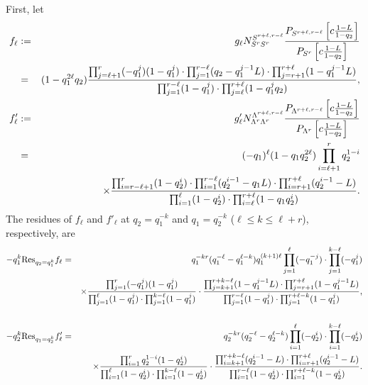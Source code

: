\documentclass[hyper,letterpaper]{JHEP3}
\begin{document}
First, let
\begin{eqnarray}
f_\ell
&:=&
g_{\ell}
N_{S^rS^r}^{S^{r+\ell,r-\ell}}
\frac{
P_{S^{r+\ell,r-\ell}}\left[ c\frac{1-L}{1-q_2} \right]
}{
P_{S^r}\left[ c\frac{1-L}{1-q_2} \right]
}
\nonumber \\
&=&
( 1-q_1^{2\ell}q_2 )
\frac{
\prod_{j=\ell+1}^{r}(-q_1^{j})( 1-q_1^{j} )
\cdot
\prod_{j=1}^{r-\ell} ( q_2-q_1^{j-1}L )
\cdot
\prod_{j=r+1}^{r+\ell} ( 1-q_1^{j-1}L )
}{
\prod_{j=1}^{r-\ell}( 1-q_1^{j} )
\cdot
\prod_{j=\ell}^{r+\ell} ( 1-q_1^{j}q_2 )
}
,
\\
f'_\ell
&:=&
g'_{\ell}
N_{\Lambda^r\Lambda^r}^{\Lambda^{r+\ell,r-\ell}}
\frac{
P_{\Lambda^{r+\ell,r-\ell}}\left[ c\frac{1-L}{1-q_2} \right]
}{
P_{\Lambda^r}\left[ c\frac{1-L}{1-q_2} \right]
}
\nonumber \\
&=&
(-q_1)^{\ell}
( 1-q_1q_2^{2\ell} )
\prod_{i=\ell+1}^{r}q_2^{1-i}
\nonumber \\
&&\hskip24pt
\times
\frac{
\prod_{i=r-\ell+1}^{r}( 1-q_2^{i} )
\cdot
\prod_{i=1}^{r-\ell} ( q_2^{i-1}-q_1L )
\cdot
\prod_{i=r+1}^{r+\ell} ( q_2^{i-1}-L )
}{
\prod_{i=1}^{\ell}( 1-q_2^{i} )
\cdot
\prod_{i=\ell }^{r+\ell} ( 1-q_1q_2^{i} )
}
.
\end{eqnarray}
%
%
The residues of $f_\ell$ and $f'_\ell$
at $q_2=q_1^{-k}$ and $q_1=q_2^{-k}$
($\ell\leq k\leq \ell+r$),
respectively, are
\begin{eqnarray}
-q_1^{k} {\rm Res}_{q_2=q_1^{k}} f_\ell
&=&
q_1^{-kr}
( q_1^{-\ell}-q_1^{\ell-k} )
q_1^{(k+1)\ell}
\prod_{j=1}^{\ell} (-q_1^{-j})\cdot\prod_{j=1}^{k-\ell} (-q_1^{j})
\nonumber \\
&&\times
\frac{
\prod_{j=1}^{r}(-q_1^{j})( 1-q_1^{j} )
}{
\prod_{j=1}^{\ell} ( 1-q_1^{j} )
\cdot
\prod_{j=1}^{k-\ell} ( 1-q_1^{j} )
}
\cdot
\frac{
\prod_{j=k+1}^{r+k-\ell} ( 1-q_1^{j-1}L )
\cdot
\prod_{j=r+1}^{r+\ell} ( 1-q_1^{j-1}L )
}{
\prod_{j=1}^{r-\ell}( 1-q_1^{j} )
\cdot
\prod_{j=1}^{r+\ell-k} ( 1-q_1^{j} )
},
\nonumber \\
&&
\label{eq:resRow}%
\\
-q_2^{k} {\rm Res}_{q_1=q_2^{k}} f'_\ell
&=&
q_2^{-kr} ( q_2^{-\ell}-q_2^{\ell-k} )
\prod_{i=1}^{\ell} (-q_2^{i}) \cdot\prod_{i=1}^{k-\ell} (-q_2^{i})
\nonumber \\
&&\times
\frac{
\prod_{i=1}^{r}q_2^{1-i}( 1-q_2^{i} )
}{
\prod_{i=1}^{\ell} ( 1-q_2^{i} )
\cdot
\prod_{i=1}^{k-\ell} ( 1-q_2^{i} )
}
\cdot
\frac{
\prod_{i=k+1}^{r+k-\ell} ( q_2^{i-1}-L )
\cdot
\prod_{i=r+1}^{r+\ell} ( q_2^{i-1}-L )
}{
\prod_{i=1}^{r-\ell}( 1-q_2^{i} )
\cdot
\prod_{i=1 }^{r+\ell-k} ( 1-q_2^{i} )
}
.
\nonumber \\
&&
\label{eq:resColumn}%
\end{eqnarray}
\end{document}
